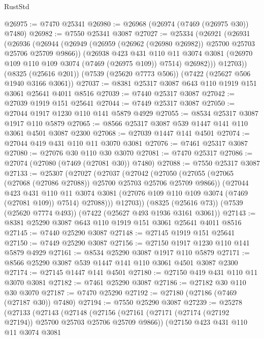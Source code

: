 \begin{lexlean}{RustStd}
\begin{coremodule}
@26975 := @7470 @25341
@26980 := @26968 (@26974 (@7469 (@26975 @30)) @7480)
@26982 := @7550 @25341 @3087
@27027 := @25334
    (@26921
      (@26931
        (@26936
          (@26944
            (@26949 (@26959 (@26962 (@26980 @26982)) @25700 @25703 @25706 @25709 @9866))
            (@26938
              @423
              @431
              @110
              @11
              @3074
              @3081
              (@26970 @109 @110 @109 @3074 (@7469 (@26975 @109)) @7514)
              @26982)))
        @12703))
    (@8325 (@25616 @201))
    (@7539 (@25620 @7773 @506))
    (@7422 (@25627 @506 @1940 @3166 @3061))
@27037 := @8381 @25317 @3087 @643 @110 @1919 @151 @3061 @25641 @4011 @8516
@27039 := @7440 @25317 @3087
@27042 := @27039 @1919 @151 @25641
@27044 := @7449 @25317 @3087
@27050 := @27044 @1917 @1230 @110 @141 @5879 @4929
@27055 := @8534 @25317 @3087 @1917 @110 @5879
@27065 := @8566 @25317 @3087 @539 @1447 @141 @110 @3061 @4501 @3087 @2300
@27068 := @27039 @1447 @141 @4501
@27074 := @27044 @419 @431 @110 @11 @3070 @3081
@27076 := @7461 @25317 @3087
@27080 := @27076 @30 @110 @30 @3070
@27081 := @7470 @25317
@27086 := @27074 (@27080 (@7469 (@27081 @30)) @7480)
@27088 := @7550 @25317 @3087
@27133 := @25307
    (@27027
      (@27037
        (@27042
          (@27050
            (@27055 (@27065 (@27068 (@27086 @27088)) @25700 @25703 @25706 @25709 @9866))
            (@27044
              @423
              @431
              @110
              @11
              @3074
              @3081
              (@27076 @109 @110 @109 @3074 (@7469 (@27081 @109)) @7514)
              @27088)))
        @12703))
    (@8325 (@25616 @73))
    (@7539 (@25620 @7774 @493))
    (@7422 (@25627 @493 @1936 @3161 @3061))
@27143 := @8381 @25290 @3087 @643 @110 @1919 @151 @3061 @25641 @4011 @8516
@27145 := @7440 @25290 @3087
@27148 := @27145 @1919 @151 @25641
@27150 := @7449 @25290 @3087
@27156 := @27150 @1917 @1230 @110 @141 @5879 @4929
@27161 := @8534 @25290 @3087 @1917 @110 @5879
@27171 := @8566 @25290 @3087 @539 @1447 @141 @110 @3061 @4501 @3087 @2300
@27174 := @27145 @1447 @141 @4501
@27180 := @27150 @419 @431 @110 @11 @3070 @3081
@27182 := @7461 @25290 @3087
@27186 := @27182 @30 @110 @30 @3070
@27187 := @7470 @25290
@27192 := @27180 (@27186 (@7469 (@27187 @30)) @7480)
@27194 := @7550 @25290 @3087
@27239 := @25278
    (@27133
      (@27143
        (@27148
          (@27156
            (@27161 (@27171 (@27174 (@27192 @27194)) @25700 @25703 @25706 @25709 @9866))
            (@27150
              @423
              @431
              @110
              @11
              @3074
              @3081

\end{coremodule}
\end{lexlean}
